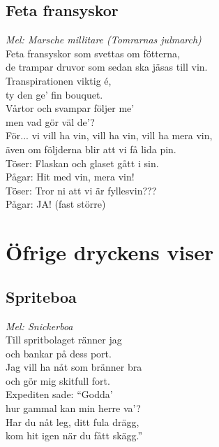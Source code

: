 \documentclass[twoside, openright]{report}
\begin{document}
\section{Feta fransyskor}
\textit{Mel: Marsche millitare (Tomrarnas julmarch)}\\

Feta fransyskor som svettas om fötterna,\\
de trampar druvor som sedan ska jäsas till vin.\\
Transpirationen viktig é,\\
ty den ge' fin bouquet.\\
Vårtor och svampar följer me’\\
men vad gör väl de’?\\

För... vi vill ha vin, vill ha vin, vill ha mera vin,\\
även om följderna blir att vi få lida pin.\\
Töser: Flaskan och glaset gått i sin.\\
Pågar: Hit med vin, mera vin!\\
Töser: Tror ni att vi är fyllesvin???\\
Pågar: JA! (fast större)\\

\chapter{Öfrige dryckens viser}

\section{Spriteboa} 
\textit{Mel: Snickerboa}\\

Till spritbolaget ränner jag\\
och bankar på dess port.\\
Jag vill ha nåt som bränner bra\\
och gör mig skitfull fort.\\
Expediten sade: ``Godda'\\
hur gammal kan min herre va'?\\
Har du nåt leg, ditt fula drägg,\\
kom hit igen när du fått skägg.''\\
\end{document}
